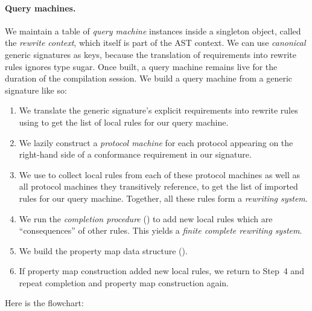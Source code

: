 \documentclass[../generics]{subfiles}
\begin{document}
\paragraph{Query machines.}
We maintain a table of \emph{query machine} instances inside a singleton object, called the \emph{rewrite context}, which itself is part of the AST context. We can use \emph{canonical} generic signatures as keys, because the translation of requirements into rewrite rules ignores type sugar. Once built, a query machine remains live for the duration of the compilation session. We build a query machine from a generic signature like so:
\begin{enumerate}
\item We translate the generic signature's explicit requirements into rewrite rules using  to get the list of local rules for our query machine.

\item We lazily construct a \emph{protocol machine} for each protocol appearing on the right-hand side of a conformance requirement in our signature.

\item We use  to collect local rules from each of these protocol machines as well as all protocol machines they transitively reference, to get the list of imported rules for our query machine. Together, all these rules form a \emph{rewriting system}.

\item We run the \emph{completion procedure} () to add new local rules which are ``consequences'' of other rules. This yields a \emph{finite complete rewriting system}.

\item We build the property map data structure ().

\item If property map construction added new local rules, we return to Step~4 and repeat completion and property map construction again.
\end{enumerate}
Here is the flowchart:
\end{document}

